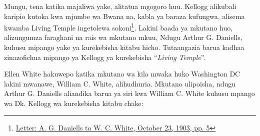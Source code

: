 Mungu, tena katika majaliwa yake, alitatua mgogoro huu. Kellogg alikubali karipio kutoka kwa mjumbe wa Bwana na, kabla ya baraza kufungwa, alisema kwamba Living Temple ingetolewa sokoni\footnote{\href{https://forgottenpillar.com/wp-content/uploads/2022/04/Letter-A-G-Daniells-to-W-C-White-October-29-1903.pdf}{Letter: A. G. Daniells to W. C. White, October 23, 1903, pp. 5}}. Lakini baada ya mkutano huo, alizungumza faraghani na rais wa mkutano mkuu, Ndugu Arthur G. Daniells, kuhusu mipango yake ya kurekebisha kitabu hicho. Tutaangazia barua kadhaa zinazofichua mipango ya Kellogg ya kurekebisha “\textit{Living Temple}”.

Ellen White hakuwepo katika mkutano wa kila mwaka huko Washington DC lakini mwanawe, William C. White, alihudhuria. Mkutano ulipoisha, ndugu Arthur G. Daniells aliandika barua ya siri kwa William C. White kuhusu mpango wa Dk. Kellogg wa kurekebisha kitabu chake:



